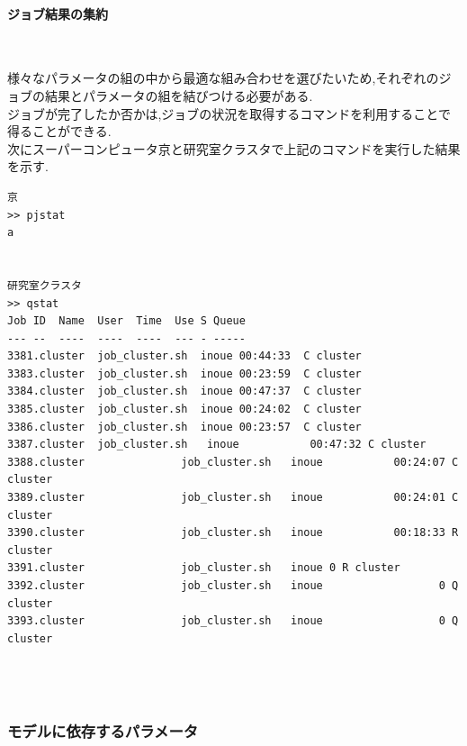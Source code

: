 \paragraph{ジョブ結果の集約}~\\
{\footnotesize

}
様々なパラメータの組の中から最適な組み合わせを選びたいため,それぞれのジョブの結果とパラメータの組を結びつける必要がある.\\
ジョブが完了したか否かは,ジョブの状況を取得するコマンドを利用することで得ることができる.\\
次にスーパーコンピュータ京と研究室クラスタで上記のコマンドを実行した結果を示す.\\
{\footnotesize
\begin{lstlisting}[numbers=none]
京
>> pjstat
a


研究室クラスタ
>> qstat
Job ID  Name  User  Time  Use S Queue
--- --  ----  ----  ----  --- - -----
3381.cluster  job_cluster.sh  inoue 00:44:33  C cluster
3383.cluster  job_cluster.sh  inoue 00:23:59  C cluster
3384.cluster  job_cluster.sh  inoue 00:47:37  C cluster
3385.cluster  job_cluster.sh  inoue 00:24:02  C cluster
3386.cluster  job_cluster.sh  inoue 00:23:57  C cluster
3387.cluster  job_cluster.sh   inoue           00:47:32 C cluster
3388.cluster               job_cluster.sh   inoue           00:24:07 C cluster
3389.cluster               job_cluster.sh   inoue           00:24:01 C cluster
3390.cluster               job_cluster.sh   inoue           00:18:33 R cluster
3391.cluster               job_cluster.sh   inoue 0 R cluster
3392.cluster               job_cluster.sh   inoue                  0 Q cluster
3393.cluster               job_cluster.sh   inoue                  0 Q cluster




\end{lstlisting}
}
\subsubsection{モデルに依存するパラメータ}
